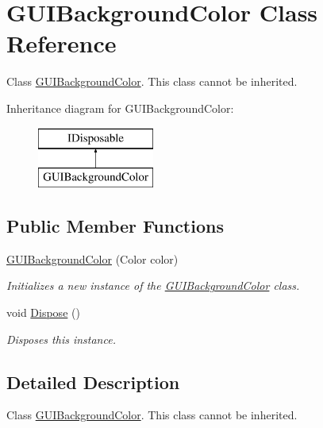 \hypertarget{class_g_u_i_background_color}{}\section{G\+U\+I\+Background\+Color Class Reference}
\label{class_g_u_i_background_color}


Class \hyperlink{class_g_u_i_background_color}{G\+U\+I\+Background\+Color}. This class cannot be inherited.  


Inheritance diagram for G\+U\+I\+Background\+Color\+:\begin{figure}[H]
\begin{center}
\leavevmode
\includegraphics[height=2.000000cm]{class_g_u_i_background_color}
\end{center}
\end{figure}
\subsection*{Public Member Functions}
\begin{DoxyCompactItemize}
\item 
\hyperlink{class_g_u_i_background_color_a0bbdf8b7ba29e00fe4587cef08e2dca0}{G\+U\+I\+Background\+Color} (Color color)
\begin{DoxyCompactList}\small\item\em Initializes a new instance of the \hyperlink{class_g_u_i_background_color}{G\+U\+I\+Background\+Color} class. \end{DoxyCompactList}\item 
void \hyperlink{class_g_u_i_background_color_a7e11cea7ee2fafcd47a45982bb3cd1ab}{Dispose} ()
\begin{DoxyCompactList}\small\item\em Disposes this instance. \end{DoxyCompactList}\end{DoxyCompactItemize}


\subsection{Detailed Description}
Class \hyperlink{class_g_u_i_background_color}{G\+U\+I\+Background\+Color}. This class cannot be inherited. 



